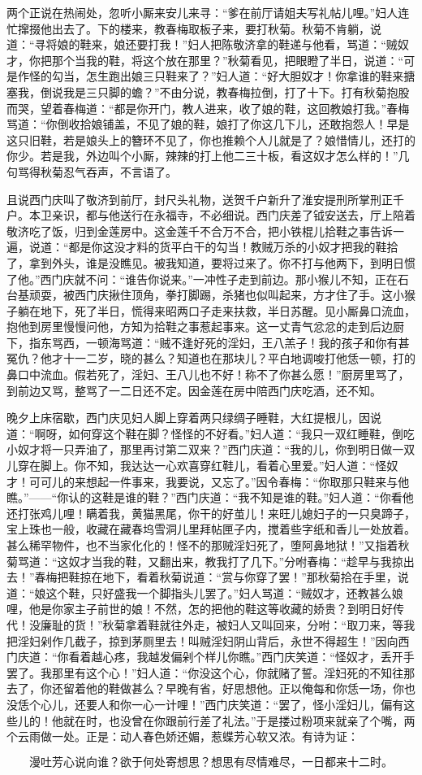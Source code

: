 两个正说在热闹处，忽听小厮来安儿来寻：“爹在前厅请姐夫写礼帖儿哩。”妇人连忙撺掇他出去了。下的楼来，教春梅取板子来，要打秋菊。秋菊不肯躺，说道：“寻将娘的鞋来，娘还要打我！”妇人把陈敬济拿的鞋递与他看，骂道：“贼奴才，你把那个当我的鞋，将这个放在那里？”秋菊看见，把眼瞪了半日，说道：“可是作怪的勾当，怎生跑出娘三只鞋来了？”妇人道：“好大胆奴才！你拿谁的鞋来搪塞我，倒说我是三只脚的蟾？”不由分说，教春梅拉倒，打了十下。打有秋菊抱股而哭，望着春梅道：“都是你开门，教人进来，收了娘的鞋，这回教娘打我。”春梅骂道：“你倒收拾娘铺盖，不见了娘的鞋，娘打了你这几下儿，还敢抱怨人！早是这只旧鞋，若是娘头上的簪环不见了，你也推赖个人儿就是了？娘惜情儿，还打的你少。若是我，外边叫个小厮，辣辣的打上他二三十板，看这奴才怎么样的！”几句骂得秋菊忍气吞声，不言语了。

且说西门庆叫了敬济到前厅，封尺头礼物，送贺千户新升了淮安提刑所掌刑正千户。本卫亲识，都与他送行在永福寺，不必细说。西门庆差了钺安送去，厅上陪着敬济吃了饭，归到金莲房中。这金莲千不合万不合，把小铁棍儿拾鞋之事告诉一遍，说道：“都是你这没才料的货平白干的勾当！教贼万杀的小奴才把我的鞋拾了，拿到外头，谁是没瞧见。被我知道，要将过来了。你不打与他两下，到明日惯了他。”西门庆就不问：“谁告你说来。”一冲性子走到前边。那小猴儿不知，正在石台基顽耍，被西门庆揪住顶角，拳打脚踢，杀猪也似叫起来，方才住了手。这小猴子躺在地下，死了半日，慌得来昭两口子走来扶救，半日苏醒。见小厮鼻口流血，抱他到房里慢慢问他，方知为拾鞋之事惹起事来。这一丈青气忿忿的走到后边厨下，指东骂西，一顿海骂道：“贼不逢好死的淫妇，王八羔子！我的孩子和你有甚冤仇？他才十一二岁，晓的甚么？知道也在那块儿？平白地调唆打他恁一顿，打的鼻口中流血。假若死了，淫妇、王八儿也不好！称不了你甚么愿！”厨房里骂了，到前边又骂，整骂了一二日还不定。因金莲在房中陪西门庆吃酒，还不知。

晚夕上床宿歇，西门庆见妇人脚上穿着两只绿绸子睡鞋，大红提根儿，因说道：“啊呀，如何穿这个鞋在脚？怪怪的不好看。”妇人道：“我只一双红睡鞋，倒吃小奴才将一只弄油了，那里再讨第二双来？”西门庆道：“我的儿，你到明日做一双儿穿在脚上。你不知，我达达一心欢喜穿红鞋儿，看着心里爱。”妇人道：“怪奴才！可可儿的来想起一件事来，我要说，又忘了。”因令春梅：“你取那只鞋来与他瞧。”——“你认的这鞋是谁的鞋？”西门庆道：“我不知是谁的鞋。”妇人道：“你看他还打张鸡儿哩！瞒着我，黄猫黑尾，你干的好茧儿！来旺儿媳妇子的一只臭蹄子，宝上珠也一般，收藏在藏春坞雪洞儿里拜帖匣子内，搅着些字纸和香儿一处放着。甚么稀罕物件，也不当家化化的！怪不的那贼淫妇死了，堕阿鼻地狱！”又指着秋菊骂道：“这奴才当我的鞋，又翻出来，教我打了几下。”分咐春梅：“趁早与我掠出去！”春梅把鞋掠在地下，看着秋菊说道：“赏与你穿了罢！”那秋菊拾在手里，说道：“娘这个鞋，只好盛我一个脚指头儿罢了。”妇人骂道：“贼奴才，还教甚么娘哩，他是你家主子前世的娘！不然，怎的把他的鞋这等收藏的娇贵？到明日好传代！没廉耻的货！”秋菊拿着鞋就往外走，被妇人又叫回来，分咐：“取刀来，等我把淫妇剁作几截子，掠到茅厕里去！叫贼淫妇阴山背后，永世不得超生！”因向西门庆道：“你看着越心疼，我越发偏剁个样儿你瞧。”西门庆笑道：“怪奴才，丢开手罢了。我那里有这个心！”妇人道：“你没这个心，你就赌了誓。淫妇死的不知往那去了，你还留着他的鞋做甚么？早晚有省，好思想他。正以俺每和你恁一场，你也没恁个心儿，还要人和你一心一计哩！”西门庆笑道：“罢了，怪小淫妇儿，偏有这些儿的！他就在时，也没曾在你跟前行差了礼法。”于是搂过粉项来就亲了个嘴，两个云雨做一处。正是：动人春色娇还媚，惹蝶芳心软又浓。有诗为证：

\[
漫吐芳心说向谁？欲于何处寄想思？
想思有尽情难尽，一日都来十二时。
\]
